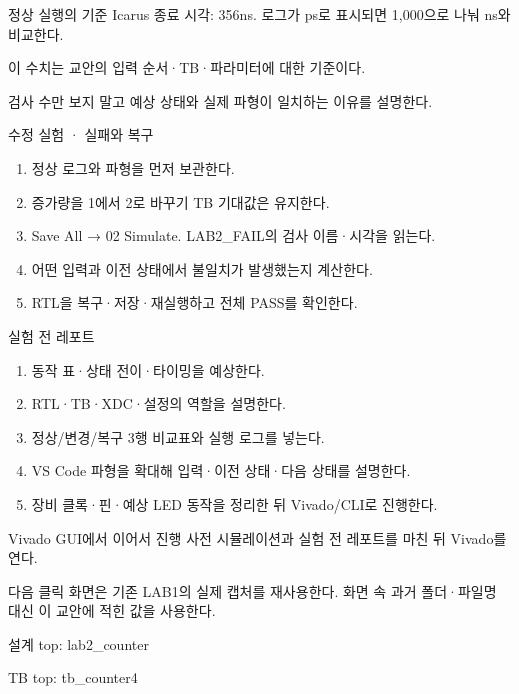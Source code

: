 \begin{frame}{정상 실행의 기준}
\small
{}Icarus 종료 시각: 356ns. 로그가 ps로 표시되면 1,000으로 나눠 ns와 비교한다.\par\vspace{0.26cm}이 수치는 교안의 입력 순서·TB·파라미터에 대한 기준이다.\par\vspace{0.26cm}검사 수만 보지 말고 예상 상태와 실제 파형이 일치하는 이유를 설명한다.\par
\end{frame}

\begin{frame}{수정 실험 · 실패와 복구}
\small
\begin{enumerate}
\item 정상 로그와 파형을 먼저 보관한다.
\item 증가량을 1에서 2로 바꾸기 TB 기대값은 유지한다.
\item Save All → 02 Simulate. LAB2\_FAIL의 검사 이름·시각을 읽는다.
\item 어떤 입력과 이전 상태에서 불일치가 발생했는지 계산한다.
\item RTL을 복구·저장·재실행하고 전체 PASS를 확인한다.
\end{enumerate}
\end{frame}

\begin{frame}[label=reports]{실험 전 레포트}
\small
\begin{enumerate}
\item 동작 표·상태 전이·타이밍을 예상한다.
\item RTL·TB·XDC·설정의 역할을 설명한다.
\item 정상/변경/복구 3행 비교표와 실행 로그를 넣는다.
\item VS Code 파형을 확대해 입력·이전 상태·다음 상태를 설명한다.
\item 장비 클록·핀·예상 LED 동작을 정리한 뒤 Vivado/CLI로 진행한다.
\end{enumerate}
\end{frame}

\begin{frame}[label=implementation]{Vivado GUI에서 이어서 진행}
\small
사전 시뮬레이션과 실험 전 레포트를 마친 뒤 Vivado를 연다.\par\vspace{0.26cm}다음 클릭 화면은 기존 LAB1의 실제 캡처를 재사용한다. 화면 속 과거 폴더·파일명 대신 이 교안에 적힌 값을 사용한다.\par\vspace{0.26cm}설계 top: lab2\_counter\par\vspace{0.26cm}TB top: tb\_counter4\par
\end{frame}

